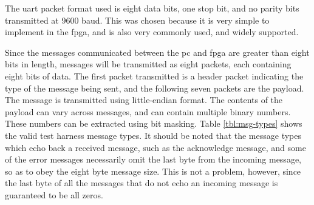 The \gls{uart} packet format used is eight data bits, one stop bit, and no parity bits transmitted at 9600 baud. This was chosen because it is very simple to implement in the \gls{fpga}, and is also very commonly used, and widely supported.

Since the messages communicated between the \gls{pc} and \gls{fpga} are greater than eight bits in length, messages will be transmitted as eight packets, each containing eight bits of data. The first packet transmitted is a header packet indicating the type of the message being sent, and the following seven packets are the payload. The message is transmitted using little-endian format. The contents of the payload can vary across messages, and can contain multiple binary numbers. These numbers can be extracted using bit masking. Table \ref{tbl:msg-types} shows the valid test harness message types. It should be noted that the message types which echo back a received message, such as the acknowledge message, and some of the error messages necessarily omit the last byte from the incoming message, so as to obey the eight byte message size. This is not a problem, however, since the last byte of all the messages that do not echo an incoming message is guaranteed to be all zeros.


